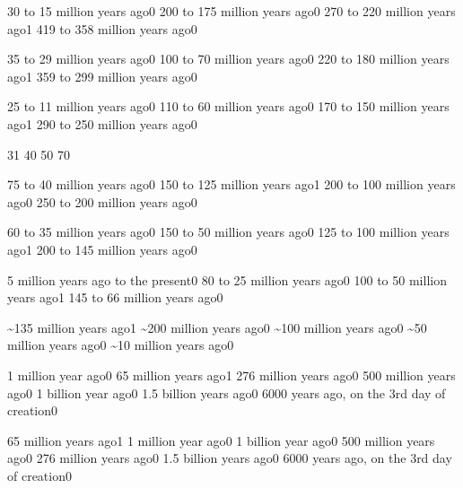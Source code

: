 {30 to 15 million years ago}{0}
{200 to 175 million years ago}{0}
{270 to 220 million years ago}{1}
{419 to 358 million years ago}{0}
\qstop

{35 to 29 million years ago}{0}
{100 to 70 million years ago}{0}
{220 to 180 million years ago}{1}
{359 to 299 million years ago}{0}
\qstop

{25 to 11 million years ago}{0}
{110 to 60 million years ago}{0}
{170 to 150 million years ago}{1}
{290 to 250 million years ago}{0}
\qstop

{3}{1}
{4}{0}
{5}{0}
{7}{0}
\qstop

{75 to 40 million years ago}{0}
{150 to 125 million years ago}{1}
{200 to 100 million years ago}{0}
{250 to 200 million years ago}{0}
\qstop

{60 to 35 million years ago}{0}
{150 to 50 million years ago}{0}
{125 to 100 million years ago}{1}
{200 to 145 million years ago}{0}
\qstop

{5 million years ago to the present}{0}
{80 to 25 million years ago}{0}
{100 to 50 million years ago}{1}
{145 to 66 million years ago}{0}
\qstop


{\textasciitilde 135 million years ago}{1}
{\textasciitilde 200 million years ago}{0}
{\textasciitilde 100 million years ago}{0}
{\textasciitilde 50 million years ago}{0}
{\textasciitilde 10 million years ago}{0}
\qstop

{1 million year ago}{0}
{65 million years ago}{1}
{276 million years ago}{0}
{500 million years ago}{0}
{1 billion year ago}{0}
{1.5 billion years ago}{0}
{6000 years ago, on the 3rd day of creation}{0}
\qstop

{65 million years ago}{1}
{1 million year ago}{0}
{1 billion year ago}{0}
{500 million years ago}{0}
{276 million years ago}{0}
{1.5 billion years ago}{0}
{6000 years ago, on the 3rd day of creation}{0}
\qstop

